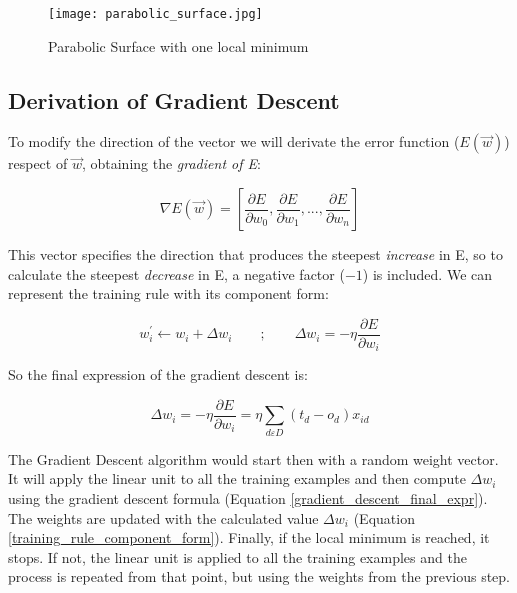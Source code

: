 	\begin{figure}[!ht]
		\centering
		\vspace{0.5cm}
		\texttt{[image: parabolic\_surface.jpg]}
		\caption{Parabolic Surface with one local minimum}
		\label{fig:parabolic_surf}
	\end{figure}

	\subsection{Derivation of Gradient Descent}
	To modify the direction of the vector we will derivate the error function ($E(\vec{w})$) respect of $\vec{w}$, obtaining the \textit{gradient of E}:

	\begin{equation}
		\label{gradient_of_E}
		\nabla E(\vec{w})= [\frac{\partial{E}}{\partial{w_{0}}}, \frac{\partial{E}}{\partial{w_{1}}}, ..., \frac{\partial{E}}{\partial{w_{n}}}]
	\end{equation}

	This vector specifies the direction that produces the steepest \textit{increase} in E, so to calculate the steepest \textit{decrease} in E, a negative factor ($-1$) is included. We can represent the training rule with its component form:

	\begin{equation}
		\label{training_rule_component_form}
		w_{i}^{'} \leftarrow w_{i} + \Delta w_{i} \qquad ; \qquad \Delta{w_{i}}=-\eta \frac{\partial{E}}{\partial{w_i}}
	\end{equation}

	So the final expression of the gradient descent is:

	\begin{equation}
		\label{gradient_descent_final_expr}
		\Delta w_i = -\eta \frac{\partial{E}}{\partial{w_i}} = \eta \sum_{d \varepsilon D} (t_d - o_d) x_{id}
	\end{equation}

	The Gradient Descent algorithm would start then with a random weight vector. It will apply the linear unit to all the training examples and then compute $\Delta w_i$ using the gradient descent formula (Equation \ref{gradient_descent_final_expr}). The weights are updated with the calculated value $\Delta{w_{i}}$ (Equation \ref{training_rule_component_form}). Finally, if the local minimum is reached, it stops. If not, the linear unit is applied to all the training examples and the process is repeated from that point, but using the weights from the previous step.

